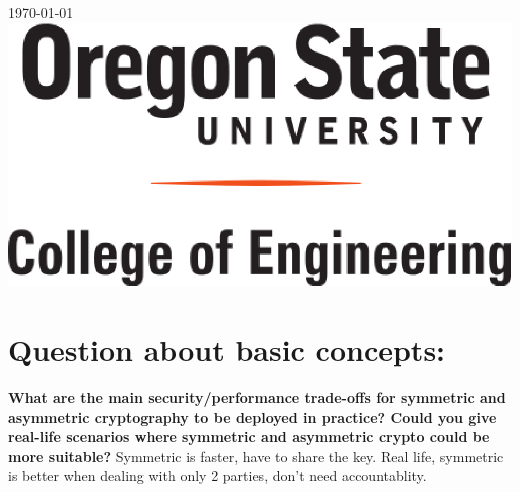 \documentclass[letterpaper,11pt,notitlepage,fleqn]{article}
\begin{document}
\begin{titlepage}

{\large \today}\\[3cm] %


    \includegraphics[scale=0.5]{coe.eps}\\[1cm] %


\vfill %



\end{titlepage}

\tableofcontents
\newpage

\section{Question about basic concepts:}
\noindent \textbf{What are the main security/performance trade-offs for symmetric and asymmetric cryptography to be deployed in practice? Could you give real-life scenarios where symmetric and asymmetric crypto could be more suitable?}
Symmetric is faster, have to share the key. Real life, symmetric is better when dealing with only 2 parties, don't need accountablity.
\end{document}
